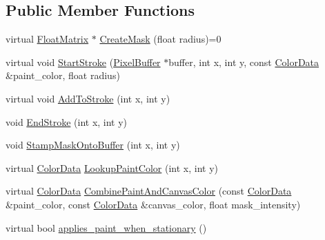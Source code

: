 \subsection*{Public Member Functions}
\begin{DoxyCompactItemize}
\item 
virtual \hyperlink{classimage__tools_1_1FloatMatrix}{Float\+Matrix} $\ast$ \hyperlink{classimage__tools_1_1Tool_a7d58325846dbc0467e52221daa1310a7}{Create\+Mask} (float radius)=0
\item 
virtual void \hyperlink{classimage__tools_1_1Tool_a1b7cd7d59588923d7e29b6150334f5b8}{Start\+Stroke} (\hyperlink{classimage__tools_1_1PixelBuffer}{Pixel\+Buffer} $\ast$buffer, int x, int y, const \hyperlink{classimage__tools_1_1ColorData}{Color\+Data} \&paint\+\_\+color, float radius)
\item 
virtual void \hyperlink{classimage__tools_1_1Tool_a84d87d7baec8a961be236d4b30636fc0}{Add\+To\+Stroke} (int x, int y)
\item 
void \hyperlink{classimage__tools_1_1Tool_aa76f5cae95ea7cdc30b067b84857a0f5}{End\+Stroke} (int x, int y)
\item 
void \hyperlink{classimage__tools_1_1Tool_a6eb57021e1e59590075411b904e62905}{Stamp\+Mask\+Onto\+Buffer} (int x, int y)
\item 
virtual \hyperlink{classimage__tools_1_1ColorData}{Color\+Data} \hyperlink{classimage__tools_1_1Tool_aaf72d26377a6563fe9002e3288933285}{Lookup\+Paint\+Color} (int x, int y)
\item 
virtual \hyperlink{classimage__tools_1_1ColorData}{Color\+Data} \hyperlink{classimage__tools_1_1Tool_a1f4f417dd13da9ff60481e3e1ff30b69}{Combine\+Paint\+And\+Canvas\+Color} (const \hyperlink{classimage__tools_1_1ColorData}{Color\+Data} \&paint\+\_\+color, const \hyperlink{classimage__tools_1_1ColorData}{Color\+Data} \&canvas\+\_\+color, float mask\+\_\+intensity)
\item 
virtual bool \hyperlink{classimage__tools_1_1Tool_a84b6d2c885d11cf1990a3c7a1343a05f}{applies\+\_\+paint\+\_\+when\+\_\+stationary} ()
\end{DoxyCompactItemize}
